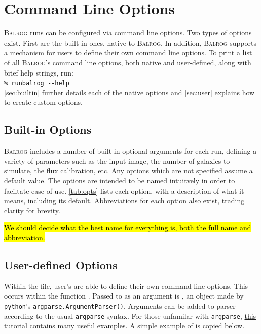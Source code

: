\documentclass[12pt]{book}
\newcommand{\balrog}{\textsc{Balrog}}
\newcommand{\opt}[1]{{\texttt{-}\texttt{-#1}}}
\newcommand{\inline}{\\[0.4cm]}
\newcommand{\bcmd}[1]{\texttt{\% runbalrog #1}}
\begin{document}
\chapter{Command Line Options}
\label{sec:cmdline}

\balrog{} runs can be configured via command line options.
Two types of options exist. First are the built-in
ones, native to \balrog{}. In addition, \balrog{}
supports a mechanism for users to define their
own command line options.
To print a list of all \balrog{}'s command line options,
both native and user-defined, along with
brief help strings, run:
\inline
\bcmd{\opt{help}}
\inline
\autoref{sec:builtin} further details each
of the native options and \autoref{sec:user}
explains how to create custom options.

\section{Built-in Options}
\label{sec:builtin}

\balrog{} includes a number of built-in optional arguments for each run, defining a
variety of parameters such as the input image,
the number of galaxies to simulate, the flux calibration, etc.
Any options which are not specified assume a default value.
The options are intended to be named intuitvely in order
to faciltate ease of use. 
\autoref{tab:opts} lists each option, with a description of 
what it means, including its default.
Abbreviations for each option also exist,
trading clarity for brevity.

\hl{We should decide what the best name for everything is, both the full name and abbreviation.}

\optstab{}

\section{User-defined Options}
\label{sec:user}

Within the \config{} file, user's are able to
define their own command line options. This occurs
within the function \argsfunc{}. Passed
to \argsfunc{}  as an argument is \argsparser{},
an object made by \texttt{python}'s
\texttt{argparse.ArgumentParser()}. Arguments
can be added to parser according to the usual
\texttt{argparse} syntax.
For those unfamilar with \texttt{argparse},
\href{http://docs.python.org/2/howto/argparse.html}{this tutorial}
contains many useful examples. A simple example of
\argsfunc{} is copied below.
\end{document}
